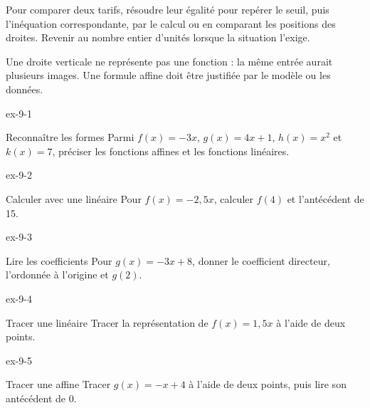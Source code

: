 \begin{savoirfaire}Pour comparer deux tarifs, résoudre leur égalité pour repérer le seuil, puis l’inéquation correspondante, par le calcul ou en comparant les positions des droites. Revenir au nombre entier d’unités lorsque la situation l’exige.\end{savoirfaire}
\begin{attention}Une droite verticale ne représente pas une fonction : la même entrée aurait plusieurs images. Une formule affine doit être justifiée par le modèle ou les données.\end{attention}
\clearpage{}
\begin{blocLivre}{ex-9-1}\begin{exercice}[1]{Reconnaître les formes}
Parmi $f(x)=-3x$, $g(x)=4x+1$, $h(x)=x^2$ et $k(x)=7$, préciser les fonctions affines et les fonctions linéaires.
\end{exercice}\end{blocLivre}
\begin{blocLivre}{ex-9-2}\begin{exercice}[1]{Calculer avec une linéaire}
Pour $f(x)=-2{,}5x$, calculer $f(4)$ et l’antécédent de 15.
\end{exercice}\end{blocLivre}
\begin{blocLivre}{ex-9-3}\begin{exercice}[1]{Lire les coefficients}
Pour $g(x)=-3x+8$, donner le coefficient directeur, l’ordonnée à l’origine et $g(2)$.
\end{exercice}\end{blocLivre}
\begin{blocLivre}{ex-9-4}\begin{exercice}[1]{Tracer une linéaire}
Tracer la représentation de $f(x)=1{,}5x$ à l’aide de deux points.
\label{fig-ex-9-4}
\end{exercice}\end{blocLivre}
\begin{blocLivre}{ex-9-5}\begin{exercice}[1]{Tracer une affine}
Tracer $g(x)=-x+4$ à l’aide de deux points, puis lire son antécédent de 0.
\label{fig-ex-9-5}
\end{exercice}\end{blocLivre}

